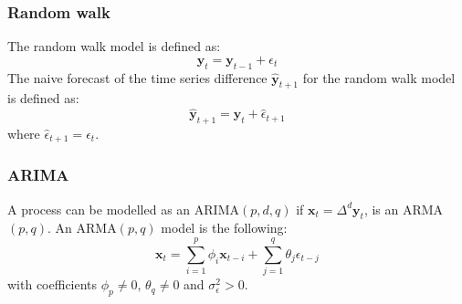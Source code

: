 \documentclass{beamer}
\begin{document}
\begin{frame}
\begin{columns}
\begin{column}{.45\linewidth}
\begin{figure}
\end{figure}
\end{column}
\end{columns}
\end{frame}

\begin{frame}
\frametitle{Random walk}
The random walk model is defined as:
\begin{equation}
\mathbf{y}_t = \mathbf{y}_{t-1} + \epsilon_{t}
\label{rwmodel}
\end{equation}
The naive forecast of the time series difference $\hat{\mathbf{y}}_{t+1}$ for the random walk model is defined as:
\begin{equation}
\hat{\mathbf{y}}_{t+1} = \mathbf{y}_t + \hat{\epsilon}_{t+1} 
\end{equation}
\noindent where  $\hat{\epsilon}_{t+1} = \epsilon_{t}$.
\end{frame}
%
%
\begin{frame}
\frametitle{ARIMA}
A process can be modelled as an ARIMA$(p,d,q)$ if $\mathbf{x}_t = \Delta^d \mathbf{y}_t $, is an ARMA$(p,q)$. An ARMA$(p,q)$ model is the following:
\begin{equation}
\mathbf{x}_t = \sum_{i=1}^p \phi_i \mathbf{x}_{t-i}  +  \sum_{j=1}^q \theta_j \epsilon_{t-j}  
\end{equation}
\noindent with coefficients $\phi_p \neq 0$, $\theta_q \neq 0$ and $\sigma_{\epsilon}^2 > 0$.
\end{frame}


\end{document}
